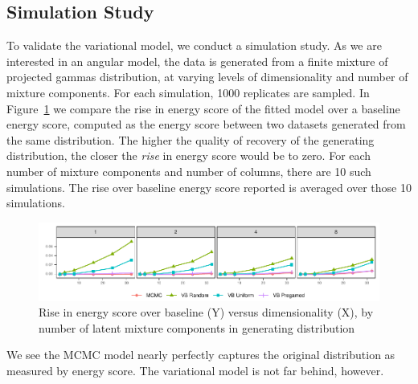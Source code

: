 \subsection{Simulation Study}
To validate the variational model, we conduct a simulation study.
    As we are interested in an angular model, the data is generated from 
    a finite mixture of projected gammas distribution, at varying levels
    of dimensionality and number of mixture components.  For each simulation,
    1000 replicates are sampled. In Figure~\ref{fig:energyscore} we compare the 
    rise in energy score of the fitted model over a baseline energy score,
    computed as the energy score between two datasets generated from the same
    distribution.  The higher the quality of recovery of the generating
    distribution, the closer the \emph{rise} in energy score would be to zero.
    For each number of mixture components and number of columns, there are 10 
    such simulations.  The rise over baseline energy score reported is averaged
    over those 10 simulations.

\begin{figure}[ht]
    \caption{Rise in energy score over baseline (Y) versus dimensionality (X), 
            by number of latent mixture components in generating distribution
            \label{fig:energyscore}}
    \includegraphics{./plots/energy_score}
\end{figure}

We see the MCMC model nearly perfectly captures the original distribution as
    measured by energy score.  The variational model is not far behind, however.

